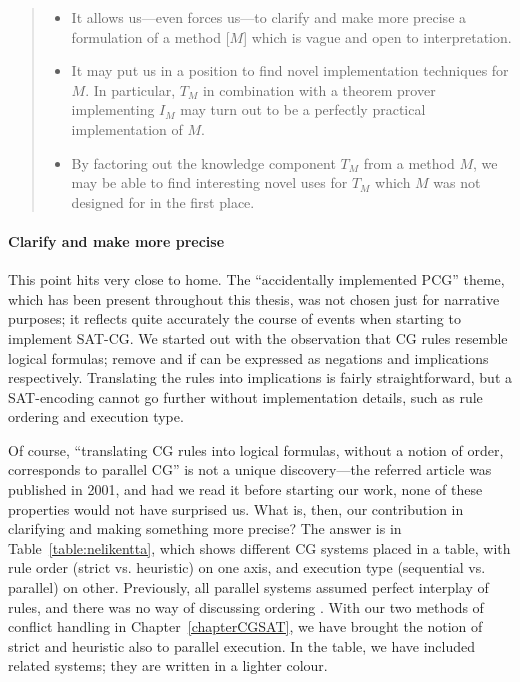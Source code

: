 \begin{quote}
\begin{itemize}
\item It allows us---even forces us---to clarify and make more precise a formulation of a method [$M$] which is vague and open to interpretation.
\item It may put us in a position to find novel implementation techniques for $M$. 
In particular, $T_M$ in combination with a theorem prover implementing $I_M$ may turn out to be a perfectly practical implementation of $M$.
\item By factoring out the knowledge component $T_M$ from a method $M$, 
we may be able to find interesting novel uses for $T_M$ which $M$ was not designed for in the first place.
\end{itemize}
\end{quote}


\paragraph{Clarify and make more precise} This point hits very close to home.
The ``accidentally implemented PCG'' theme, which has been present throughout this thesis, was not chosen just for narrative purposes; it reflects quite accurately the course of events when starting to implement SAT-CG.
We started out with the observation that CG rules resemble logical formulas; {\sc remove} and {\sc if } can be expressed as negations and implications respectively. 
Translating the rules into implications is fairly straightforward, but a SAT-encoding cannot go further without implementation details, such as rule ordering and execution type. 

Of course, ``translating CG rules into logical formulas, without a notion of order, corresponds to parallel CG'' is not a unique discovery---the referred article was published in 2001, and had we read it before starting our work, none of these properties would not have surprised us.
What is, then, our contribution in clarifying and making something more precise?
The answer is in Table~\ref{table:nelikentta}, which shows different CG systems 
placed in a table, with rule order (strict vs. heuristic) on one axis, 
and execution type (sequential vs. parallel) on other.
Previously, all parallel systems assumed perfect interplay of rules, 
and there was no way of discussing ordering . 
With our two methods of conflict handling in Chapter~\ref{chapterCGSAT}, 
we have brought the notion of strict and heuristic also to parallel execution. 
In the table, we have included related systems; they are written in a lighter colour.

